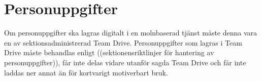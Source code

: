 \documentclass[10pt]{article}
\begin{document}
    

    \section{Personuppgifter}
    Om personuppgifter ska lagras digitalt i en molnbaserad tjänst måste denna vara en av sektionsadministrerad Team Drive. 
    Personuppgifter som lagras i Team Drive måste behandlas enligt ((sektionensriktlinjer för hantering av personuppgifter)), får inte delas vidare utanför sagda Team Drive och får inte laddas ner annat än för kortvarigt motiverbart bruk.
\end{document}
